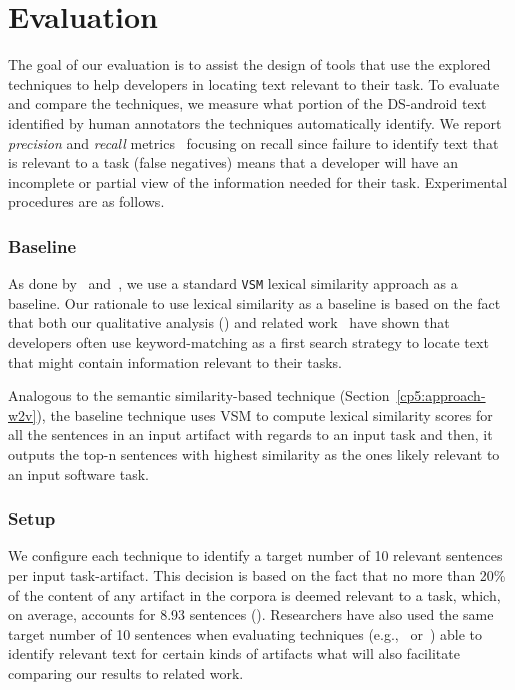 \clearpage

\section{Evaluation}
\label{cp5:evaluation}



The goal of our evaluation is to assist the design of tools that use the explored techniques to help developers in locating text relevant to their task. 
To evaluate and compare the techniques,
we measure what portion of the \acs{DS-android} text identified by human annotators the techniques automatically identify.
We report \textit{precision} and \textit{recall} metrics~\cite{manning2010IR}
focusing on recall since failure to identify text that is relevant to a task (false negatives)
means that a developer will have an incomplete or partial view of the information needed for their task.
Experimental procedures are as follows.



\subsubsection{Baseline}


As done by~\cite{Lin2021} and~\cite{Ye2016}, we use a standard \texttt{VSM} lexical similarity approach as a baseline. Our rationale to use 
lexical similarity as a baseline is based on the fact that 
both our qualitative analysis () and
related work~\cite{Ko2006a, Freund2015} have shown that developers often use keyword-matching as a first search strategy to locate text that might contain information relevant to their tasks.


Analogous to the semantic similarity-based technique (Section~\ref{cp5:approach-w2v}), the baseline technique uses VSM to compute lexical similarity scores 
for all the sentences in an input artifact with regards to an input task and then, it outputs the top-n sentences with highest similarity as the ones likely relevant to an input software task.




\subsubsection{Setup}



We configure each technique to identify a target number of 10 relevant sentences per input task-artifact.
This decision is based on the fact that 
no more than 20\% of the content of any artifact in the corpora is deemed relevant to a task, which, on average, accounts for 8.93 sentences ().
Researchers have also used the same target number of 10 sentences when evaluating techniques  (e.g.,~\cite{Xu2017} or~\cite{Lotufo2012}) able to identify relevant text for certain kinds of artifacts
what will also facilitate comparing our results to related work.


